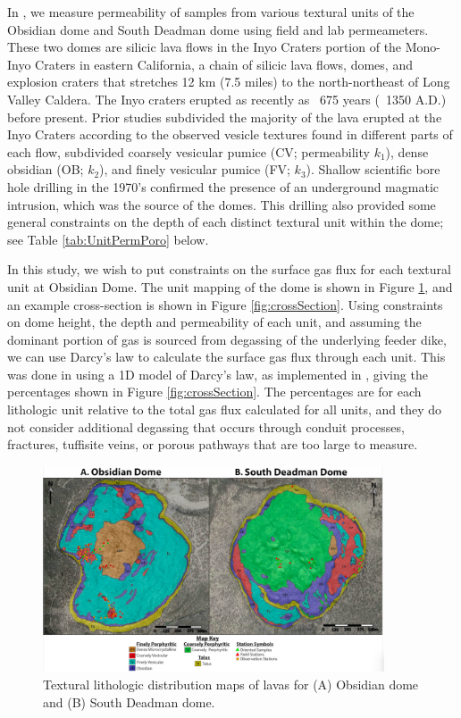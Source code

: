\documentclass[11pt]{amsart}
\begin{document}
In \cite{Graham2023}, we measure permeability of samples from various textural units of the Obsidian dome and South Deadman dome using field and lab permeameters. These two domes are silicic lava flows in the Inyo Craters portion of the Mono-Inyo Craters in eastern California, a chain of silicic lava flows, domes, and explosion craters that stretches 12 km (7.5 miles) to the north-northeast of Long Valley Caldera. The Inyo craters erupted as recently as ~675 years (~1350 A.D.) before present. Prior studies subdivided the majority of the lava erupted at the Inyo Craters according to the observed vesicle textures found in different parts of each flow, subdivided coarsely vesicular pumice (CV; permeability $k_1$), dense obsidian (OB; $k_2$), and finely vesicular pumice (FV; $k_3$).  Shallow scientific bore hole drilling in the 1970's confirmed the presence of an underground magmatic intrusion, which was the source of the domes. This drilling also provided some general constraints on the depth of each distinct textural unit within the dome; see Table \ref{tab:UnitPermPoro} below.

In this study, we wish to put constraints on the surface gas flux for each textural unit at Obsidian Dome. The unit mapping of the dome is shown in Figure \ref{fig:unitMapping}, and an example cross-section is shown in Figure \ref{fig:crossSection}.  Using constraints on dome height, the depth and permeability of each unit, and assuming the dominant portion of gas is sourced from degassing of the underlying feeder dike, we can use Darcy's law to calculate the surface gas flux through each unit. This was done in \cite{Graham2023} using a 1D model of Darcy's law, as implemented in \cite{Edmonds2003}, giving the percentages shown in Figure \ref{fig:crossSection}.  The percentages are for each lithologic unit relative to the total gas flux calculated for all units, and they do not consider additional degassing that occurs through conduit processes, fractures, tuffisite veins, or porous pathways that are too large to measure.

\begin{figure}
   \centering
\includegraphics[width=0.9\textwidth]{figs/unitMapping-small.png}
\caption{Textural lithologic distribution maps of lavas for (A) Obsidian dome and (B) South Deadman dome.}
\label{fig:unitMapping}
\end{figure}
\end{document}
